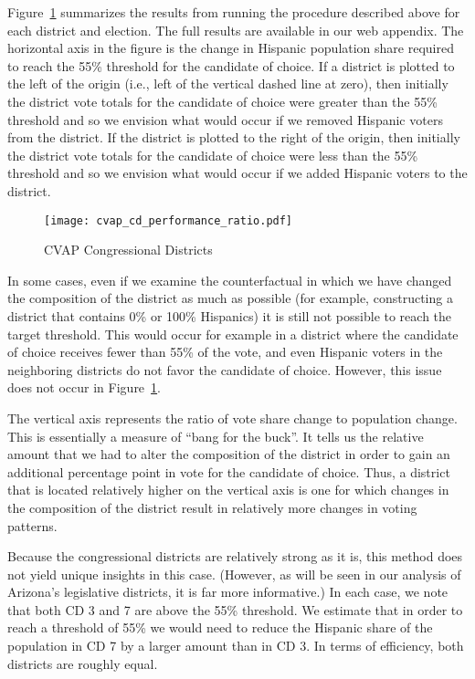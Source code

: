 \documentclass[12pt,draft]{scrartcl}
\begin{document}
Figure~\ref{cvap_cd_performance_ratio} summarizes the results from
running the procedure described above for each district and election.
The full results are available in our web appendix. The horizontal
axis in the figure is the change in Hispanic population share required
to reach the 55\% threshold for the candidate of choice. If a district
is plotted to the left of the origin (i.e., left of the vertical
dashed line at zero), then initially the district vote totals for the
candidate of choice were greater than the 55\% threshold and so we
envision what would occur if we removed Hispanic voters from the
district. If the district is plotted to the right of the origin, then
initially the district vote totals for the candidate of choice were
less than the 55\% threshold and so we envision what would occur if we
added Hispanic voters to the district.
\begin{figure}[p!h]
  \begin{centering}
    \texttt{[image: cvap\_cd\_performance\_ratio.pdf]}
    \caption{CVAP Congressional Districts}
  \end{centering}
  \label{cvap_cd_performance_ratio}
\end{figure}

In some cases, even if we examine the counterfactual in which we have
changed the composition of the district as much as possible (for
example, constructing a district that contains 0\% or 100\% Hispanics)
it is still not possible to reach the target threshold. This would
occur for example in a district where the candidate of choice receives
fewer than 55\% of the vote, and even Hispanic voters in the
neighboring districts do not favor the candidate of choice. However,
this issue does not occur in Figure~\ref{cvap_cd_performance_ratio}.

The vertical axis represents the ratio of vote share change to
population change. This is essentially a measure of ``bang for the
buck''. It tells us the relative amount that we had to alter the
composition of the district in order to gain an additional percentage
point in vote for the candidate of choice. Thus, a district that is
located relatively higher on the vertical axis is one for which
changes in the composition of the district result in relatively more
changes in voting patterns.

Because the congressional districts are relatively strong as it is,
this method does not yield unique insights in this case.  (However, as
will be seen in our analysis of Arizona's legislative districts, it is
far more informative.)  In each case, we note that both CD 3 and 7 are
above the 55\% threshold.  We estimate that in order to reach a
threshold of 55\% we would need to reduce the Hispanic share of the
population in CD 7 by a larger amount than in CD 3. In terms of
efficiency, both districts are roughly equal.
\end{document}

